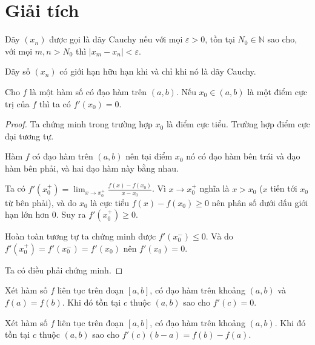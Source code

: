 \documentclass{mynotes}
\theoremstyle{definition}
\newcommand{\NN}{\mathbb{N}}
\begin{document}




\chapter{Giải tích}

\begin{definition}
    Dãy $(x_n)$ được gọi là dãy Cauchy nếu với mọi $\varepsilon > 0$, tồn tại $N_0 \in \NN$ sao cho, với mọi $m, n > N_0$ thì $\lvert x_m - x_n \rvert < \varepsilon$.
\end{definition}

\begin{theorem}
    Dãy số $(x_n)$ có giới hạn hữu hạn khi và chỉ khi nó là dãy Cauchy.
\end{theorem}

\begin{theorem}[Bổ đề Fermat]
    Cho $f$ là một hàm số có đạo hàm trên $(a, b)$. Nếu $x_0 \in (a, b)$ là một điểm cực trị của $f$ thì ta có $f'(x_0) = 0$.
\end{theorem}

\begin{proof}
    Ta chứng minh trong trường hợp $x_0$ là điểm cực tiểu. Trường hợp điểm cực đại tương tự.

    Hàm $f$ có đạo hàm trên $(a, b)$ nên tại điểm $x_0$ nó có đạo hàm bên trái và đạo hàm bên phải, và hai đạo hàm này bằng nhau.

    Ta có $\displaystyle{f'(x_0^+) = \lim_{x \to x_0^+} \frac{f(x) - f(x_0)}{x - x_0}}$. Vì $x \to x_0^+$ nghĩa là $x > x_0$ ($x$ tiến tới $x_0$ từ bên phải), và do $x_0$ là cực tiểu $f(x) - f(x_0) \geqslant 0$ nên phân số dưới dấu giới hạn lớn hơn 0. Suy ra $f'(x_0^+) \geqslant 0$.

    Hoàn toàn tương tự ta chứng minh được $f'(x_0^-) \leqslant 0$. Và do $f'(x_0^+) = f'(x_0^-) = f'(x_0)$ nên $f'(x_0) = 0$.

    Ta có điều phải chứng minh.
\end{proof}

\begin{theorem}
    Xét hàm số $f$ liên tục trên đoạn $[a, b]$, có đạo hàm trên khoảng $(a, b)$ và $f(a) = f(b)$. Khi đó tồn tại $c$ thuộc $(a, b)$ sao cho $f'(c) = 0$.
\end{theorem}

\begin{theorem}
    Xét hàm số $f$ liên tục trên đoạn $[a, b]$, có đạo hàm trên khoảng $(a, b)$. Khi đó tồn tại $c$ thuộc $(a, b)$ sao cho $f'(c) (b - a) = f(b) - f(a)$.
\end{theorem}
\end{document}
